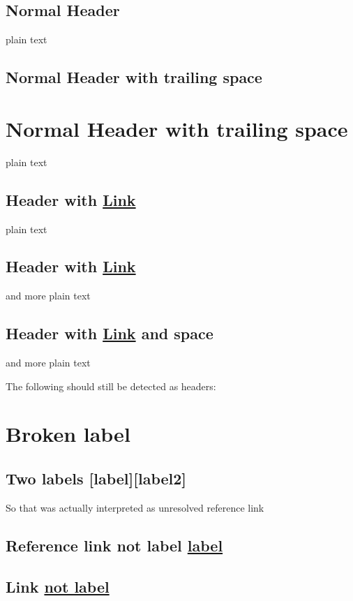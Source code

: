 
\def\mytitle{MultiMarkdown Headers Test}
\def\latexmode{memoir}

\section{Normal Header}
\label{normalheader}

plain text

\section{Normal Header with trailing space}
\label{normalheaderwithtrailingspace}

\chapter{Normal Header with trailing space}
\label{normalheaderwithtrailingspace}

plain text

\section{Header with \href{http://www.google.com}{Link}}
\label{headerwithlink}

plain text

\section{Header with \href{http://www.google.com}{Link}}
\label{headerwithlink}

and more plain text

\section{Header with \href{http://www.google.com}{Link} and space}
\label{headerwithlinkandspace}

and more plain text

The following should still be detected as headers:

\chapter{Broken label}
\label{}

\section{Two labels [label][label2]}
\label{0}

So that was actually interpreted as unresolved reference link

\section{Reference link not label \href{http://example.com/}{label}}
\label{referencelinknotlabellabel}

\section{Link \href{http://example.net/}{not label}}
\label{linknotlabel}




